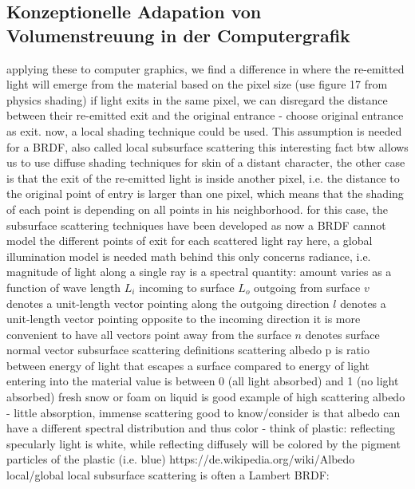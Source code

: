 \documentclass[ngerman,runningheads,a4paper]{llncs}[2018/03/10]
\begin{document}
\subsection{Konzeptionelle Adapation von Volumenstreuung in der Computergrafik}

 applying these to computer graphics, we find a difference in where the re-emitted light will emerge from the material based on the pixel size (use figure 17 from physics shading)
       if light exits in the same pixel, we can disregard the distance between their re-emitted exit and the original entrance - choose original entrance as exit. now, a local shading technique could be used.
         This assumption is needed for a BRDF, also called local subsurface scattering
         this interesting fact btw allows us to use diffuse shading techniques for skin of a distant character,
       the other case is that the exit of the re-emitted light is inside another pixel, i.e. the distance to the original point of entry is larger than one pixel, which means that the shading of each point is depending on all points in his neighborhood.
         for this case, the subsurface scattering techniques have been developed as now a BRDF cannot model the different points of exit for each scattered light ray
         here, a global illumination model is needed
     math behind this only concerns radiance, i.e. magnitude of light along a single ray
       is a spectral quantity: amount varies as a function of wave length
       $L_i$ incoming to surface
       $L_o$ outgoing from surface
       $v$ denotes a unit-length vector pointing along the outgoing direction
       $l$ denotes a unit-length vector pointing opposite to the incoming direction
         it is more convenient to have all vectors point away from the surface
       $n$ denotes surface normal vector
   subsurface scattering
     definitions
       scattering albedo p is ratio between energy of light that escapes a surface compared to energy of light entering into the material
         value is between 0 (all light absorbed) and 1 (no light absorbed)
         fresh snow or foam on liquid is good example of high scattering albedo - little absorption, immense scattering
         good to know/consider is that albedo can have a different spectral distribution and thus color - think of plastic: reflecting specularly light is white, while reflecting diffusely will be colored by the pigment particles of the plastic (i.e. blue)
         https://de.wikipedia.org/wiki/Albedo
     local/global
       local subsurface scattering is often a Lambert BRDF:
\end{document}
